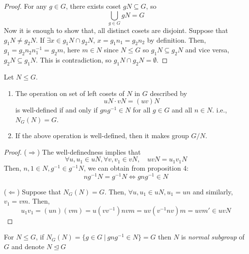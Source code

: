 \documentclass[12pt, a4paper, openany, twoside]{book}
\theoremstyle{definition}
\theoremstyle{remark}
\theoremstyle{plain}
\numberwithin{equation}{section}
\begin{document}
\begin{proof}
    
For any $g \in G$, there exists coset $gN \subseteq G$, so 
\[\bigcup_{g \in G} gN = G\]
Now it is enough to show that, all distinct cosets are disjoint. Suppose that $g_1N \neq g_2N$. 
If $\exists x \in g_1N \cap g_2N$, $x = g_1n_1 = g_2n_2$ by definition. Then, $g_1 = g_2 n_2 n_1^{-1} = g_2m$, here $m \in N$ since $N \leq G$
so $g_1 N \subseteq g_2 N$ and vice versa, $g_2 N \subseteq g_1 N$. This is contradiction, so $g_1 N \cap g_2N = \emptyset$. 

\end{proof}

\begin{tcolorbox}[colback=yellow!10!white,colframe=green!75!black,title=Proposition 5]

Let $N \leq G$. 

\begin{enumerate}
    \item The operation on set of left cosets of $N$ in $G$ described by 
    \[uN \cdot vN = (uv)N\]
    is well-defined if and only if $gng^{-1} \in N$ for all $g \in G$ and all $n \in N$. 
    i.e., $N_G(N) = G$. 
    \item If the above operation is well-defined, then it makes group $G/N$. 
\end{enumerate}

\end{tcolorbox}

\begin{proof}
    
($\Rightarrow$) The well-definedness implies that 
\[\forall u, u_1 \in uN, \forall v, v_1 \in vN, \quad uvN = u_1v_1N \]
Then, $n, 1\in N, g^{-1} \in g^{-1}N$, we can obtain from proposition 4: 
\[ng^{-1}N = g^{-1}N \iff gng^{-1} \in N\]

($\Leftarrow$) Suppose that $N_G(N) = G$. Then, $\forall u, u_1 \in uN, u_1 = un$ and similarly, $v_1 = vm$. 
Then, 
\[u_1 v_1 = (un)(vm) = u(vv^{-1})nvm = uv(v^{-1}nv)m = uvm' \in uvN\]

\end{proof}

\begin{tcolorbox}[colback=yellow!10!white,colframe=brown!75!black,title=Normal Subgroup]

For $N \leq G$, if $N_G(N) = \{g \in G ~|~ gng^{-1} \in N\} = G$ then $N$ is \textit{normal subgroup} of $G$ and denote 
$N \trianglelefteq G$

\end{tcolorbox}
\end{document}
